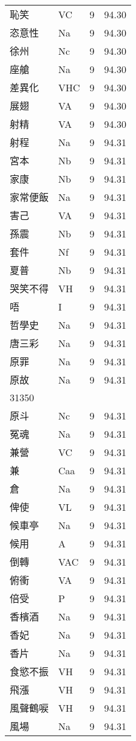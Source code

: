 \documentclass[twocolumn]{book}
\begin{document}
\begin{supertabular}{llrr}
恥笑 & VC & 9 &  94.30\\
恣意性 & Na & 9 &  94.30\\
徐州 & Nc & 9 &  94.30\\
座艙 & Na & 9 &  94.30\\
差異化 & VHC & 9 &  94.30\\
展翅 & VA & 9 &  94.30\\
射精 & VA & 9 &  94.30\\
射程 & Na & 9 &  94.31\\
宮本 & Nb & 9 &  94.31\\
家康 & Nb & 9 &  94.31\\
家常便飯 & Na & 9 &  94.31\\
害己 & VA & 9 &  94.31\\
孫震 & Nb & 9 &  94.31\\
套件 & Nf & 9 &  94.31\\
夏普 & Nb & 9 &  94.31\\
哭笑不得 & VH & 9 &  94.31\\
唔 & I & 9 &  94.31\\
哲學史 & Na & 9 &  94.31\\
唐三彩 & Na & 9 &  94.31\\
原罪 & Na & 9 &  94.31\\
原故 & Na & 9 &  94.31\\
31350\\
原斗 & Nc & 9 &  94.31\\
冤魂 & Na & 9 &  94.31\\
兼營 & VC & 9 &  94.31\\
兼 & Caa & 9 &  94.31\\
倉 & Na & 9 &  94.31\\
俾使 & VL & 9 &  94.31\\
候車亭 & Na & 9 &  94.31\\
候用 & A & 9 &  94.31\\
倒轉 & VAC & 9 &  94.31\\
俯衝 & VA & 9 &  94.31\\
倍受 & P & 9 &  94.31\\
香檳酒 & Na & 9 &  94.31\\
香妃 & Na & 9 &  94.31\\
香片 & Na & 9 &  94.31\\
食慾不振 & VH & 9 &  94.31\\
飛漲 & VH & 9 &  94.31\\
風聲鶴唳 & VH & 9 &  94.31\\
風場 & Na & 9 &  94.31\\

\end{supertabular}
\end{document}
